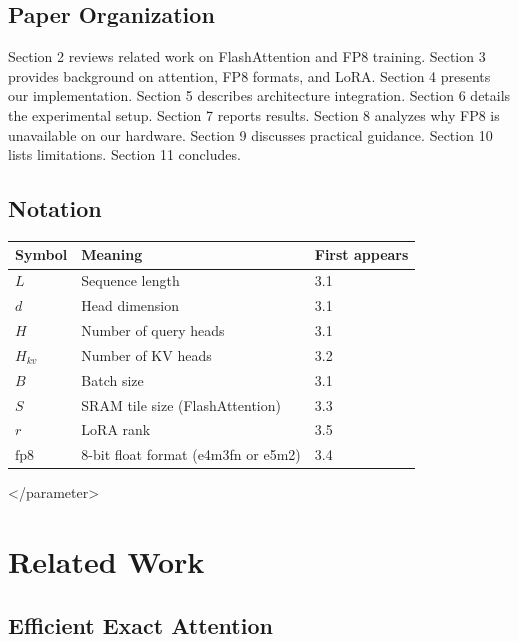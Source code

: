 \subsection{Paper Organization}

Section 2 reviews related work on FlashAttention and FP8 training. Section 3 
provides background on attention, FP8 formats, and LoRA. Section 4 presents 
our implementation. Section 5 describes architecture integration. Section 6 
details the experimental setup. Section 7 reports results. Section 8 
analyzes why FP8 is unavailable on our hardware. Section 9 discusses 
practical guidance. Section 10 lists limitations. Section 11 concludes.



\subsection{Notation}

\begin{table}[H]
\centering
\small
\begin{tabular}{lll}
\toprule
\textbf{Symbol} & \textbf{Meaning} & \textbf{First appears} \\
\midrule
$L$ & Sequence length & 3.1 \\
$d$ & Head dimension & 3.1 \\
$H$ & Number of query heads & 3.1 \\
$H_{kv}$ & Number of KV heads & 3.2 \\
$B$ & Batch size & 3.1 \\
$S$ & SRAM tile size (FlashAttention) & 3.3 \\
$r$ & LoRA rank & 3.5 \\
$\text{fp8}$ & 8-bit float format (e4m3fn or e5m2) & 3.4 \\
\bottomrule
\end{tabular}
\end{table}
\textless{}/parameter\textgreater{}




\section{Related Work}

\subsection{Efficient Exact Attention}

